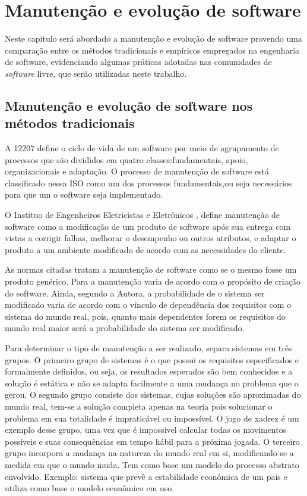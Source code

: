 \chapter{Manutenção e evolução de software}
\label{cap-evol-software}

Neste capítulo será abordado a manutenção e evolução de software provendo uma comparação entre os métodos tradicionais e empíricos empregados na engenharia de software, evidenciando algumas práticas adotadas nas comunidades de \textit{software} livre, que serão utilizadas neste trabalho.

\section{Manutenção e evolução de software nos métodos tradicionais}
\label{sect-manut-evol-soft}

A  12207 define o ciclo de vida de um software por meio de agrupamento de processos que são divididos em quatro classes:fundamentais, apoio, organizacionais e adaptação. O processo de manutenção de software está classificado nessa ISO como um dos processos fundamentais,ou seja necessários para que um o software seja implementado.


O Instituo de Engenheiros Eletricistas e Eletrônicos , define manutenção de software como a modificação de um produto de software após sua entrega com vistas a corrigir falhas, melhorar o desempenho ou outros atributos, e adaptar o produto a um ambiente modificado de acordo com as necessidades do cliente.

As normas citadas tratam a manutenção de software como se o mesmo fosse um produto genérico. Para  a manutenção varia de acordo com o propósito de criação do software. Ainda, segundo a Autora, a probabilidade de o sistema ser modificado varia de acordo com o vínculo de dependência dos requisitos com o sistema do mundo real, pois, quanto mais dependentes forem os requisitos do mundo real maior será a probabilidade do sistema ser modificado.

Para determinar o tipo de manutenção a ser realizado,  separa sistemas em três grupos. O primeiro grupo de sistemas é o que possui os requisitos especificados e formalmente definidos, ou seja, os resultados esperados são bem conhecidos e a solução é estática e não se adapta facilmente a uma mudança no problema que o gerou. O segundo grupo consiste dos sistemas, cujas soluções são aproximadas do mundo real, tem-se a solução completa apenas na teoria pois solucionar o problema em sua totalidade é impraticável ou impossível. O jogo de xadrez é um exemplo desse grupo, uma vez que é impossível calcular todas os movimentos possíveis e suas consequências em tempo hábil para a próxima jogada. O terceiro grupo incorpora a mudança na natureza do mundo real em si,  modificando-se a medida em que o mundo muda. Tem como base um modelo do processo abstrato envolvido. Exemplo: sistema que prevê a estabilidade econômica de um país e utiliza como base o modelo econômico em uso.

